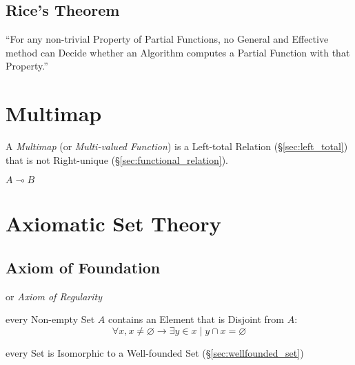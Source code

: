 \subsection{Rice's Theorem}\label{sec:rices_theorem}

``For any non-trivial Property of Partial Functions, no General and
Effective method can Decide whether an Algorithm computes a Partial
Function with that Property.''



\section{Multimap}\label{sec:multimap}

A \emph{Multimap} (or \emph{Multi-valued Function}) is a Left-total
Relation (\S\ref{sec:left_total}) that is not Right-unique
(\S\ref{sec:functional_relation}).

$A \multimap B$



\section{Axiomatic Set Theory}\label{sec:axiomatic_set_theory}

\subsection{Axiom of Foundation}\label{sec:foundation_axiom}

or \emph{Axiom of Regularity}

every Non-empty Set $A$ contains an Element that is Disjoint from $A$:
\[
  \forall x, x \neq \varnothing \rightarrow \exists y \in x \mid y
  \cap x = \varnothing
\]

every Set is Isomorphic to a Well-founded Set
(\S\ref{sec:wellfounded_set})



